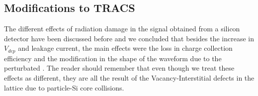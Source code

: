 
\subsection{Modifications to TRACS}

The different effects of radiation damage in the signal obtained from a silicon detector have been discussed before and we concluded that besides the increase in $V_{dep}$ and leakage current, the main effects were the loss in charge collection efficiency and the modification in the shape of the waveform due to the perturbated \neff. The reader should remember that even though we treat these effects as different, they are all the result of the Vacancy-Interstitial defects in the lattice due to particle-Si core collisions.




